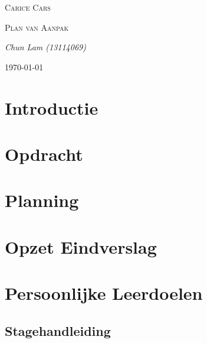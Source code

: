 \documentclass[]{report}
\begin{document}
\begin{titlepage}
\centering
\par\vspace{1cm}
{\scshape\LARGE Carice Cars \par}
\vspace{3cm}
{\scshape\Large Plan van Aanpak  \par}
\vspace{0.5cm}
\vfill
{\Large\itshape Chun Lam (13114069)\par}


\vspace{1cm}
{\large \today\par}
\end{titlepage}
\newpage

%



\tableofcontents
\newpage

\chapter{Introductie}
\label{introduction}


\chapter{Opdracht}
\label{ch:opdracht}


\chapter{Planning}
\label{ch:planning}


\chapter{Opzet Eindverslag}
\label{ch:eindverslag}


\chapter{Persoonlijke Leerdoelen}
\label{ch:leerdoelen}


\begin{thebibliography}{9}


\end{thebibliography}

\begin{appendix}
\chapter{Stagehandleiding}
\label{app:handleiding}


\end{appendix}
\end{document}
